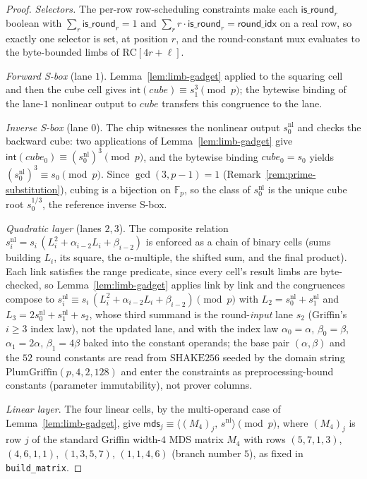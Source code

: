 \begin{proof}
\emph{Selectors.} The per-row row-scheduling constraints make each $\mathsf{is\_round}_r$ boolean with $\sum_r \mathsf{is\_round}_r = 1$ and $\sum_r r\cdot\mathsf{is\_round}_r = \mathsf{round\_idx}$ on a real row, so exactly one selector is set, at position $r$, and the round-constant mux evaluates to the byte-bounded limbs of $\mathrm{RC}[4r{+}\ell]$.

\emph{Forward S-box} (lane $1$). Lemma~\ref{lem:limb-gadget} applied to the squaring cell and then the cube cell gives $\mathsf{int}(\mathit{cube}) \equiv s_1^{3} \pmod{p}$; the bytewise binding of the lane-$1$ nonlinear output to $\mathit{cube}$ transfers this congruence to the lane.

\emph{Inverse S-box} (lane $0$). The chip witnesses the nonlinear output $s^{\mathrm{nl}}_0$ and checks the backward cube: two applications of Lemma~\ref{lem:limb-gadget} give $\mathsf{int}(\mathit{cube}_0) \equiv (s^{\mathrm{nl}}_0)^{3} \pmod{p}$, and the bytewise binding $\mathit{cube}_0 = s_0$ yields $(s^{\mathrm{nl}}_0)^{3} \equiv s_0 \pmod{p}$. Since $\gcd(3,p-1)=1$ (Remark~\ref{rem:prime-substitution}), cubing is a bijection on $\mathbb{F}_p$, so the class of $s^{\mathrm{nl}}_0$ is the unique cube root $s_0^{1/3}$, the reference inverse S-box.

\emph{Quadratic layer} (lanes $2,3$). The composite relation $s^{\mathrm{nl}}_i = s_i\,(L_i^{2}+\alpha_{i-2}L_i+\beta_{i-2})$ is enforced as a chain of binary cells (sums building $L_i$, its square, the $\alpha$-multiple, the shifted sum, and the final product). Each link satisfies the range predicate, since every cell's result limbs are byte-checked, so Lemma~\ref{lem:limb-gadget} applies link by link and the congruences compose to $s^{\mathrm{nl}}_i \equiv s_i\,(L_i^{2}+\alpha_{i-2}L_i+\beta_{i-2}) \pmod{p}$ with $L_2 = s^{\mathrm{nl}}_0+s^{\mathrm{nl}}_1$ and $L_3 = 2s^{\mathrm{nl}}_0+s^{\mathrm{nl}}_1+s_2$, whose third summand is the round-\emph{input} lane $s_2$ (Griffin's $i\ge 3$ index law), not the updated lane, and with the index law $\alpha_0=\alpha$, $\beta_0=\beta$, $\alpha_1=2\alpha$, $\beta_1=4\beta$ baked into the constant operands; the base pair $(\alpha,\beta)$ and the $52$ round constants are read from $\mathrm{SHAKE256}$ seeded by the domain string $\mathrm{PlumGriffin}(p,4,2,128)$ and enter the constraints as preprocessing-bound constants (parameter immutability), not prover columns.

\emph{Linear layer}. The four linear cells, by the multi-operand case of Lemma~\ref{lem:limb-gadget}, give $\mathsf{mds}_j \equiv \bigl\langle (M_4)_j,\, s^{\mathrm{nl}} \bigr\rangle \pmod{p}$, where $(M_4)_j$ is row $j$ of the standard Griffin width-$4$ MDS matrix $M_4$ with rows $(5,7,1,3)$, $(4,6,1,1)$, $(1,3,5,7)$, $(1,1,4,6)$ (branch number $5$), as fixed in \texttt{build\_matrix}.


\end{proof}
